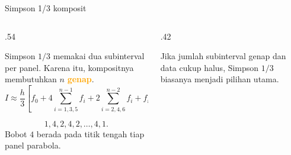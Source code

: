 \documentclass[aspectratio=169,10pt]{beamer}
\newcommand{\highlight}[1]{\textcolor{Orange}{\textbf{#1}}}
\begin{document}
\begin{frame}{Simpson 1/3 komposit}
\scriptsize
\begin{columns}[T,totalwidth=\textwidth]
\begin{column}{.54\textwidth}
\begin{bluebox}
Simpson $1/3$ memakai dua subinterval per panel. Karena itu, kompositnya membutuhkan $n$ \highlight{genap}.
\[
I\approx \frac{h}{3}\left[f_0+4\sum_{i=1,3,5}^{n-1}f_i+2\sum_{i=2,4,6}^{n-2}f_i+f_n\right].
\]
\end{bluebox}
\begin{orangebox}
\[
1,
4,
2,
4,
2,
\ldots,
4,
1.
\]
Bobot $4$ berada pada titik tengah tiap panel parabola.
\end{orangebox}
\end{column}
\begin{column}{.42\textwidth}
\vspace{2mm}
\begin{greenbox}
Jika jumlah subinterval genap dan data cukup halus, Simpson $1/3$ biasanya menjadi pilihan utama.
\end{greenbox}
\end{column}
\end{columns}
\end{frame}
\end{document}
